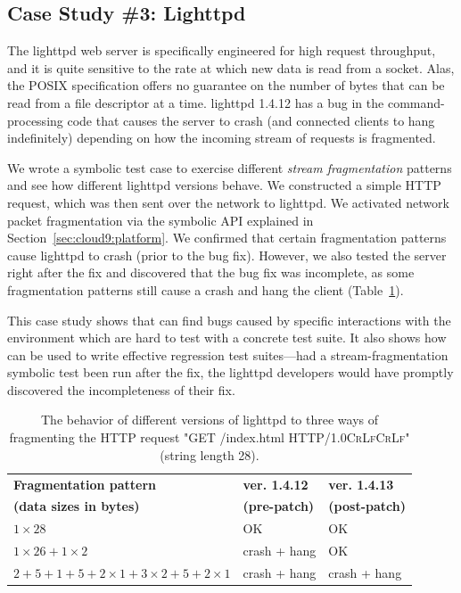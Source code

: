 \subsection{Case Study \#3: Lighttpd}
\label{sec:eval:lighttpd}


The lighttpd web server is specifically engineered for high request throughput, and it is quite sensitive to the rate at which new data is read from a socket.  Alas, the POSIX specification offers no guarantee on the number of bytes that can be read from a file descriptor at a time.  lighttpd 1.4.12 has a bug in the command-processing code that causes the server to crash (and connected clients to hang indefinitely) depending on how the incoming stream of requests is fragmented. 

We wrote a symbolic test case to exercise different \emph{stream fragmentation} patterns and see how different lighttpd versions behave. We constructed a simple HTTP request, which was then sent over the network to lighttpd. We activated network packet fragmentation via the symbolic   API explained in Section~\ref{sec:cloud9:platform}. We confirmed that certain fragmentation patterns cause lighttpd to crash (prior to the bug fix). However, we also tested the server right after the fix and discovered that the bug fix was incomplete, as some fragmentation patterns still cause a crash and hang the client (Table~\ref{table:lighttpd}).

This case study shows that \cnine can find bugs caused by specific interactions with the environment which are hard to test with a concrete test suite. It also shows how \cnine can be used to write effective regression test suites---had a stream-fragmentation symbolic test been run after the fix, the lighttpd developers would have promptly discovered the incompleteness of their fix.

\begin{table}
\small
\centering
\begin{tabular}{| p{3.8cm} | p{1.65cm} | p{1.65cm} |}
\hline
\bf Fragmentation pattern & \bf ver. 1.4.12 & \bf ver. 1.4.13 \\
\bf (data sizes in bytes) & \bf (pre-patch)     & \bf (post-patch)\\
\hline
$1 \times 28$ 			& 		OK		& OK \\
\hline
$1 \times 26 + 1 \times 2$  & crash + hang 	& OK \\
\hline
$2+5+1+5+2 \times 1 + 3 \times 2 + 5 + 2 \times 1 $	& crash + hang 	& crash + hang \\
\hline
\end{tabular}
\caption{The behavior of different versions of lighttpd to three ways of fragmenting the HTTP request "GET /index.html HTTP/1.0\textsc{Cr}\textsc{Lf}\textsc{Cr}\textsc{Lf}" (string length 28).}
\label{table:lighttpd}
\end{table}

